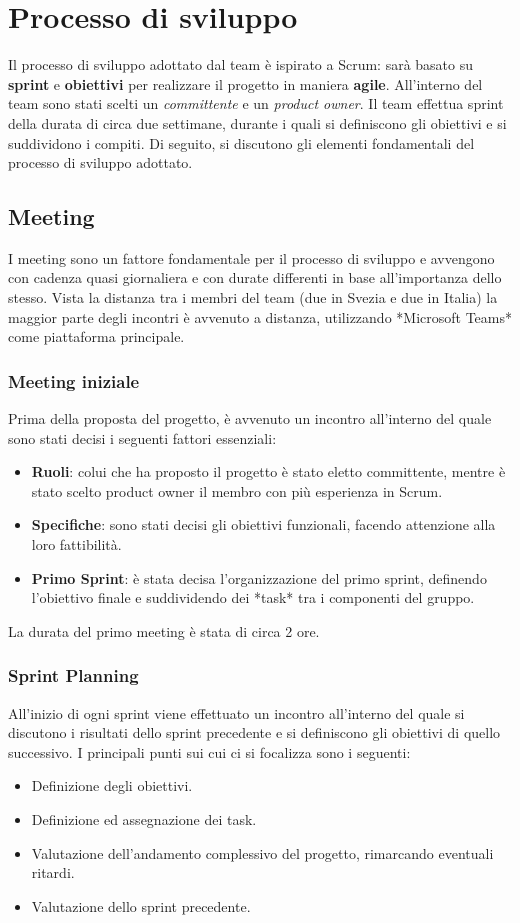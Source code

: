 \section{Processo di sviluppo}
\label{sec:development}
Il processo di sviluppo adottato dal team è ispirato a Scrum: sarà basato su \textbf{sprint} e \textbf{obiettivi} per realizzare il progetto in maniera \textbf{agile}.
All'interno del team sono stati scelti un \textit{committente} e un \textit{product owner}.
Il team effettua sprint della durata di circa due settimane, durante i quali si definiscono gli obiettivi e si suddividono i compiti.
Di seguito, si discutono gli elementi fondamentali del processo di sviluppo adottato.

\subsection{Meeting}
I meeting sono un fattore fondamentale per il processo di sviluppo e avvengono con cadenza quasi giornaliera e con durate differenti in base all'importanza dello stesso. Vista la distanza tra i membri del team (due in Svezia e due in Italia) la maggior parte degli incontri è avvenuto a distanza, utilizzando *Microsoft Teams* come piattaforma principale.

\subsubsection{Meeting iniziale}
Prima della proposta del progetto, è avvenuto un incontro all'interno del quale sono stati decisi i seguenti fattori essenziali:
\begin{itemize}
  \item \textbf{Ruoli}: colui che ha proposto il progetto è stato eletto committente, mentre è stato scelto product owner il membro con più esperienza in Scrum.
  \item \textbf{Specifiche}: sono stati decisi gli obiettivi funzionali, facendo attenzione alla loro fattibilità.
  \item \textbf{Primo Sprint}: è stata decisa l'organizzazione del primo sprint, definendo l'obiettivo finale e suddividendo dei *task* tra i componenti del gruppo.
\end{itemize}
La durata del primo meeting è stata di circa 2 ore.

\subsubsection{Sprint Planning}
All'inizio di ogni sprint viene effettuato un incontro all'interno del quale si discutono i risultati dello sprint precedente e si definiscono gli obiettivi di quello successivo. I principali punti sui cui ci si focalizza sono i seguenti:
\begin{itemize}
  \item Definizione degli obiettivi.
  \item Definizione ed assegnazione dei task.
  \item Valutazione dell'andamento complessivo del progetto, rimarcando eventuali ritardi.
  \item Valutazione dello sprint precedente.
\end{itemize}

